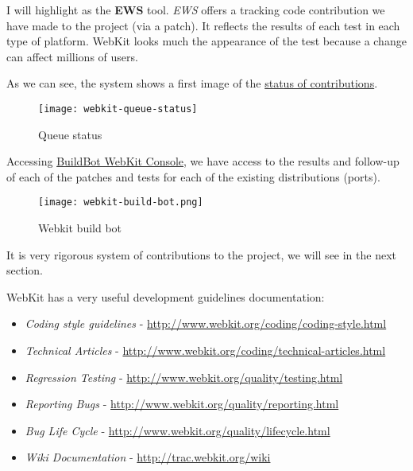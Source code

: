 \par I will highlight as the \textbf{EWS} tool. \textit{EWS} offers a tracking code contribution we have made to the project (via a patch). It reflects the results of each test in each type of platform. WebKit looks much the appearance of the test because a change can affect millions of users.

\par As we can see, the system shows a first image of the \href{http://webkit-commit-queue.appspot.com/}{status of contributions}.

\begin{figure}[htp]
    \centering
    \texttt{[image: webkit-queue-status]}
    \caption{Queue status}
    \label{queue-status}
\end{figure}

\par Accessing \href{http://build.webkit.org/console}{BuildBot WebKit Console}, we have access to the results and follow-up of each of the patches and tests for each of the existing distributions (ports).

\begin{figure}[htp]
    \centering
    \texttt{[image: webkit-build-bot.png]}
    \caption{Webkit build bot}
    \label{build-bot}
\end{figure}

\par It is very rigorous system of contributions to the project, we will see in the next section.

\par WebKit has a very useful development guidelines documentation:

\begin{itemize}
	\item \textit{Coding style guidelines} - \url{http://www.webkit.org/coding/coding-style.html}
	\item \textit{Technical Articles} - \url{http://www.webkit.org/coding/technical-articles.html}
	\item \textit{Regression Testing} - \url{http://www.webkit.org/quality/testing.html}
	\item \textit{Reporting Bugs} - \url{http://www.webkit.org/quality/reporting.html}
	\item \textit{Bug Life Cycle} - \url{http://www.webkit.org/quality/lifecycle.html}
	\item \textit{Wiki Documentation} - \url{http://trac.webkit.org/wiki}
\end{itemize}

